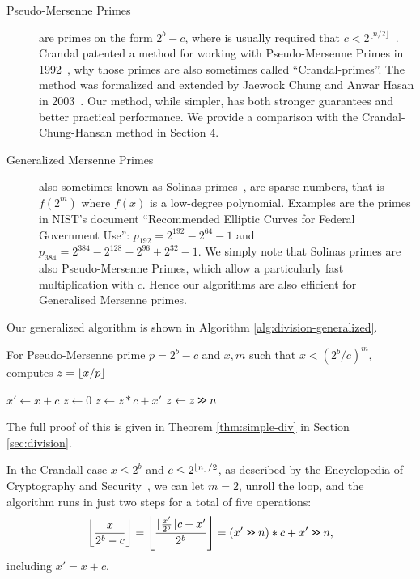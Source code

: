 \begin{description}
   \item[Pseudo-Mersenne Primes]
      are primes on the form $2^b-c$, where is usually required that $c < 2^{\lfloor n/2\rfloor}$~\cite{van2014encyclopedia}.
      Crandal patented a method for working with Pseudo-Mersenne Primes in 1992~\cite{crandall1992method},
      why those primes are also sometimes called ``Crandal-primes''.
      The method was formalized and extended by Jaewook Chung and Anwar Hasan in 2003~\cite{chung2003more}.
      Our method, while simpler, has both stronger guarantees and better practical performance.
      We provide a comparison with the Crandal-Chung-Hansan method in Section 4.
   \item[Generalized Mersenne Primes]
      also sometimes known as Solinas primes~\cite{Solinas2011}, are sparse numbers, that is $f(2^m)$ where $f(x)$ is a low-degree polynomial.
      Examples are the primes in NIST's document ``Recommended Elliptic Curves for Federal Government Use'':
         $p_{192} = 2^{192} - 2^{64} - 1$
      and
         $p_{384} = 2^{384}-2^{128}-2^{96}+2^{32}-1$.
      We simply note that Solinas primes are also Pseudo-Mersenne Primes, which allow a particularly fast multiplication with $c$.
      Hence our algorithms are also efficient for Generalised Mersenne primes.
\end{description}

Our generalized algorithm is shown in Algorithm \ref{alg:division-generalized}.
\begin{algorithm}[H]
   \caption{For Pseudo-Mersenne prime $p=2^b-c$ and $x,m$ such that $x< (2^b/c)^m$, computes
      $z=\lfloor {x/p} \rfloor$}
   \label{alg:division-generalized}
   \begin{algorithmic}
         \State $x' \gets x + c$
         \State $z \gets 0$
            \State $z \gets z * c + x'$
            \State $z \gets z \mathbin{\texttt{>\!>}} n$
         \EndFor
   \end{algorithmic}
\end{algorithm}
The full proof of this is given in Theorem \ref{thm:simple-div} in Section \ref{sec:division}.

In the Crandall case $x\le 2^b$ and $c\le 2^{\lfloor {n} \rfloor/2}$, as described by the Encyclopedia of Cryptography and Security~\cite{van2014encyclopedia}, we can let $m=2$, unroll the loop, and the algorithm runs in just two steps for a total of five operations:
   $$
   \left\lfloor\frac{x}{2^b-c}\right\rfloor
   = \left\lfloor\frac{\lfloor\frac{x'}{2^b}\rfloor c + x'}{2^b}\right\rfloor
      = (x' \mathbin{\texttt{>\!>}} n)*c + x' \mathbin{\texttt{>\!>}} n
   ,$$
   including $x'=x+c$.

